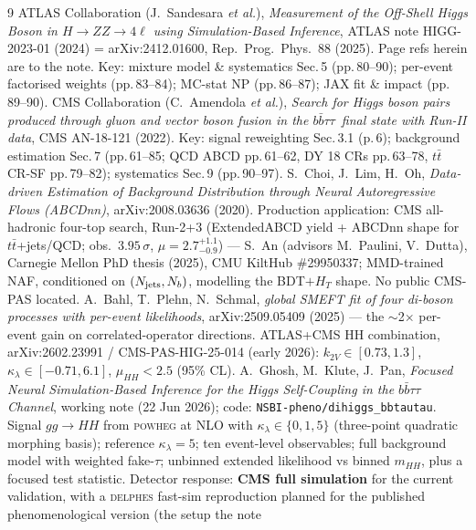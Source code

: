 \documentclass[11pt]{article}
\newcommand{\kl}{\ensuremath{\kappa_\lambda}}
\newcommand{\mhh}{\ensuremath{m_{HH}}}
\newcommand{\bbtt}{\ensuremath{b\bar b\tau\tau}}
\begin{document}
\begin{thebibliography}{9}\small
{} ATLAS Collaboration (J.~Sandesara \emph{et al.}), \emph{Measurement of the Off-Shell Higgs Boson in
  $H\to ZZ\to4\ell$ using Simulation-Based Inference}, ATLAS note HIGG-2023-01 (2024) = arXiv:2412.01600,
  Rep.\ Prog.\ Phys.\ 88 (2025). Page refs herein are to the note. Key: mixture model \& systematics Sec.\,5
  (pp.\,80--90); per-event factorised weights (pp.\,83--84); MC-stat NP (pp.\,86--87); JAX fit \& impact
  (pp.\,89--90).
 CMS Collaboration (C.~Amendola \emph{et al.}), \emph{Search for Higgs boson pairs produced through
  gluon and vector boson fusion in the \bbtt\ final state with Run-II data}, CMS AN-18-121 (2022). Key: signal
  reweighting Sec.\,3.1 (p.\,6); background estimation Sec.\,7 (pp.\,61--85; QCD ABCD pp.\,61--62, DY 18 CRs
  pp.\,63--78, $t\bar t$ CR-SF pp.\,79--82); systematics Sec.\,9 (pp.\,90--97).
 S.~Choi, J.~Lim, H.~Oh, \emph{Data-driven Estimation of Background Distribution through Neural
  Autoregressive Flows (ABCDnn)}, arXiv:2008.03636 (2020). Production application: CMS all-hadronic four-top search,
  Run-2+3 (ExtendedABCD yield + ABCDnn shape for $t\bar t$+jets/QCD; obs.\ $3.95\,\sigma$, $\mu=2.7^{+1.1}_{-0.9}$)
  --- S.~An (advisors M.~Paulini, V.~Dutta), Carnegie Mellon PhD thesis (2025), CMU KiltHub \#29950337;
  MMD-trained NAF, conditioned on $(N_{\rm jets},N_b)$, modelling the BDT$+H_T$ shape. No public CMS-PAS located.
 A.~Bahl, T.~Plehn, N.~Schmal, \emph{global SMEFT fit of four di-boson processes with per-event
  likelihoods}, arXiv:2509.05409 (2025) --- the $\sim$2$\times$ per-event gain on correlated-operator directions.
 ATLAS+CMS HH combination, arXiv:2602.23991 / CMS-PAS-HIG-25-014 (early 2026):
  $k_{2V}\in[0.73,1.3]$, $\kl\in[-0.71,6.1]$, $\mu_{HH}<2.5$ (95\% CL).
 A.~Ghosh, M.~Klute, J.~Pan, \emph{Focused Neural Simulation-Based Inference for the Higgs
  Self-Coupling in the $b\bar b\tau\tau$ Channel}, working note (22 Jun 2026); code:
  \texttt{NSBI-pheno/dihiggs\_bbtautau}. Signal $gg\to HH$ from \textsc{powheg} at NLO with
  $\kappa_\lambda\in\{0,1,5\}$ (three-point quadratic morphing basis); reference $\kappa_\lambda=5$; ten event-level
  observables; full background model with weighted fake-$\tau$; unbinned extended likelihood vs binned \mhh, plus a
  focused test statistic. Detector response: \textbf{CMS full simulation} for the current validation, with a
  \textsc{delphes} fast-sim reproduction planned for the published phenomenological version (the setup the note

\end{thebibliography}
\end{document}

